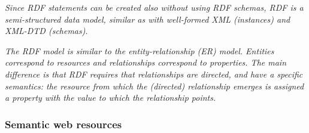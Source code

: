 	\emph{Since RDF
statements can be created also without using RDF schemas, RDF is a semi-structured data
model, similar as with well-formed XML (instances) and XML-DTD (schemas)}.

\emph{The RDF model is similar to the entity-relationship (ER) model. Entities correspond to
resources and relationships correspond to properties. The main difference is that RDF
requires that relationships are directed, and have a specific semantics: the resource from
which the (directed) relationship emerges is assigned a property with the value to which the
relationship points. }

\subsubsection{Semantic web resources} %
\label{ssub:semantic_web_resources}


